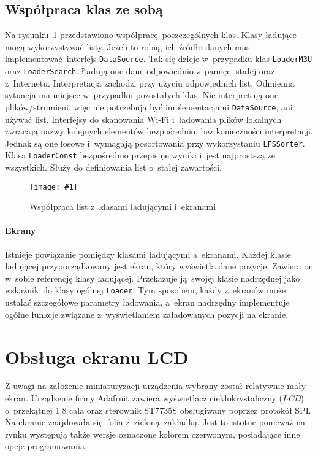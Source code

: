 \documentclass[polish]{aghengthesis}
\newcommand{\imgint}[4]{
	\begin{figure}[{#4}]
		\centering
		\texttt{[image: \#1]}
		\caption{#2}
		\label{#1}
	\end{figure}
}
\newcommand{\imgh}[3]{\imgint{#1}{#2}{#3}{H}}
\begin{document}
		\subsection{Współpraca klas ze sobą}
			Na rysunku~\ref{3/PicoRadio-loaders} przedstawiono współpracę poszczególnych klas. Klasy ładujące mogą wykorzystywać listy. Jeżeli to robią, ich źródło danych musi implementować interfejs \lstinline|DataSource|. Tak się dzieje w~przypadku klas \lstinline|LoaderM3U| oraz \lstinline|LoaderSearch|. Ładują one dane odpowiednio z~pamięci stałej oraz z~Internetu. Interpretacja zachodzi przy użyciu odpowiednich list. Odmienna sytuacja ma miejsce w~przypadku pozostałych klas. Nie interpretują one plików/strumieni, więc nie potrzebują być implementacjami \lstinline|DataSource|, ani używać list. Interfejsy do skanowania Wi-Fi i~ładowania plików lokalnych zwracają nazwy kolejnych elementów bezpośrednio, bez konieczności interpretacji. Jednak są one losowe i~wymagają posortowania przy wykorzystaniu \lstinline|LFSSorter|. Klasa \lstinline|LoaderConst| bezpośrednio przepisuje wyniki i~jest najprostszą ze wszystkich. Służy do definiowania list o~stałej zawartości.
			
			\imgh{3/PicoRadio-loaders}{Współpraca list z~klasami ładującymi i~ekranami}{0.95}
			
			\paragraph{Ekrany}
				Istnieje powiązanie pomiędzy klasami ładującymi a~ekranami. Każdej klasie ładującej przyporządkowany jest ekran, który wyświetla dane pozycje. Zawiera on w~sobie referencję klasy ładującej. Przekazuje ją swojej klasie nadrzędnej jako wskaźnik do klasy ogólnej \lstinline|Loader|. Tym sposobem, każdy z~ekranów może ustalać szczegółowe parametry ładowania, a~ekran nadrzędny implementuje ogólne funkcje związane z~wyświetlaniem załadowanych pozycji na ekranie.
	
	\section{Obsługa ekranu LCD}
		\label{sec:screen}
		Z uwagi na założenie miniaturyzacji urządzenia wybrany został relatywnie mały ekran. Urządzenie firmy Adafruit zawiera wyświetlacz ciekłokrystaliczny (\textit{LCD}) o~przekątnej 1.8 cala oraz sterownik ST7735S obsługiwany poprzez protokół SPI. Na ekranie znajdowała się folia z~zieloną zakładką. Jest to istotne ponieważ na rynku występują także wersje oznaczone kolorem czerwonym, posiadające inne opcje programowania.
		$ $\\
		
\end{document}
